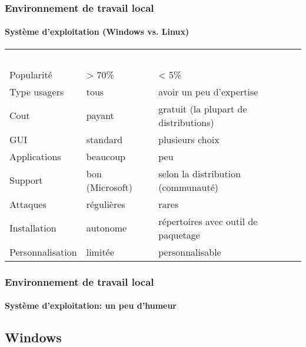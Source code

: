 \documentclass[xcolor=table]{beamer}
\begin{document}
\begin{frame}
\frametitle{Environnement de travail local}
\framesubtitle{Système d'exploitation (Windows vs. Linux)}

	
\begin{tabular}{p{}p{}p{}}
	\rowcolor{darkblue}
	& \textcolor{white}{Windows} & \textcolor{white}{Linux} \\
	
	Popularité & > 70\% & < 5\% \\
	
	Type usagers & tous & avoir un peu d'expertise \\
	
	Cout & payant & gratuit (la plupart de distributions) \\
	
	GUI & standard & plusieurs choix \\
	
	Applications & beaucoup & peu\\
	
	Support & bon (Microsoft) & selon la distribution (communauté) \\
	
	Attaques & régulières & rares\\
	
	Installation & autonome & répertoires avec outil de paquetage \\
	
	Personnalisation & limitée & personnalisable \\
\end{tabular}

\end{frame}


\begin{frame}
\frametitle{Environnement de travail local}
\framesubtitle{Système d'exploitation: un peu d'humeur}

\begin{center}
\end{center}

\end{frame}

\subsection{Windows}
\end{document}
